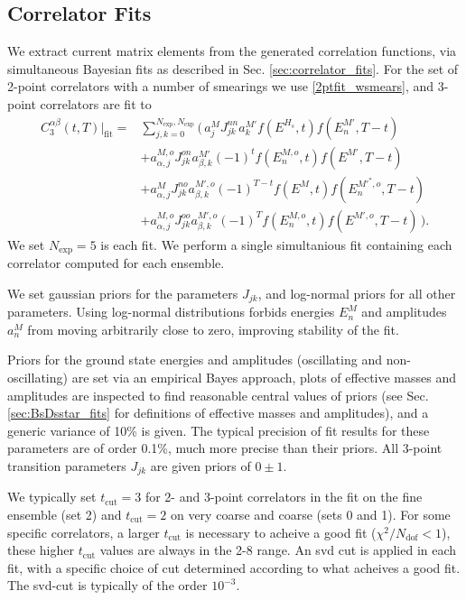 \subsection{Correlator Fits}

We extract current matrix elements from the generated correlation functions, via simultaneous Bayesian fits as described in Sec. \ref{sec:correlator_fits}. For the set of 2-point correlators with a number of smearings we use \eqref{2ptfit_wsmears}, and 3-point correlators are fit to
\begin{align}
  \nonumber
  C^{\alpha\beta}_{3}(t,T)|_{\text{fit}} =& \sum_{j,k=0}^{N_{\text{exp}},N_{\text{exp}}} \Big(\, a^{M}_j J^{nn}_{jk} a^{M'}_k f(E^{H_s},t) f(E^{M'}_n,T-t)
  \\ \nonumber
  &+a^{M,o}_{\alpha,j} J^{on}_{jk} a_{\beta,k}^{M'} (-1)^t f(E^{M,o}_n,t) f(E^{M'},T-t)
  \\ \nonumber
  &+a_{\alpha,j}^{M} J^{no}_{jk} a_{\beta,k}^{M',o} (-1)^{T-t} f(E^{M},t) f(E^{M'^*,o}_n,T-t)
  \\
  &+a_{\alpha,j}^{M,o} J^{oo}_{jk} a_{\beta,k}^{M',o} (-1)^T f(E^{M,o}_n,t) f(E^{M',o},T-t) \,\Big).
  \label{eq:3ptcorrelator_real}
\end{align}
We set $N_{\text{exp}}=5$ is each fit. We perform a single simultanious fit containing each correlator computed for each ensemble.

We set gaussian priors for the parameters $J_{jk}$, and log-normal priors for all other parameters. Using log-normal distributions forbids energies $E_n^M$ and amplitudes $a_n^M$ from moving arbitrarily close to zero, improving stability of the fit.

Priors for the ground state energies and amplitudes (oscillating and non-oscillating) are set via an empirical Bayes approach, plots of effective masses and amplitudes are inspected to find reasonable central values of priors (see Sec. \ref{sec:BsDsstar_fits} for definitions of effective masses and amplitudes), and a generic variance of 10\% is given. The typical precision of fit results for these parameters are of order 0.1\%, much more precise than their priors. All 3-point transition parameters $J_{jk}$ are given priors of $0\pm 1$.

We typically set $t_{\text{cut}}=3$ for 2- and 3-point correlators in the fit on the fine ensemble (set 2) and $t_{\text{cut}}=2$ on very coarse and coarse (sets 0 and 1). For some specific correlators, a larger $t_{\text{cut}}$ is necessary to acheive a good fit ($\chi^2/N_{\text{dof}} < 1$), these higher $t_{\text{cut}}$ values are always in the 2-8 range. An svd cut is applied in each fit, with a specific choice of cut determined according to what acheives a good fit. The svd-cut is typically of the order $10^{-3}$.

